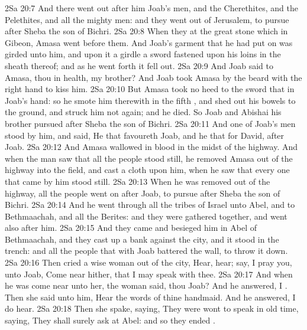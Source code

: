 \vs 2Sa 20:7 And there went out after him Joab's men, and the Cherethites, and the Pelethites, and all the mighty men: and they went out of Jerusalem, to pursue after Sheba the son of Bichri.
\vs 2Sa 20:8 When they  at the great stone which  in Gibeon, Amasa went before them. And Joab's garment that he had put on was girded unto him, and upon it a girdle  a sword fastened upon his loins in the sheath thereof; and as he went forth it fell out.
\vs 2Sa 20:9 And Joab said to Amasa,  thou in health, my brother? And Joab took Amasa by the beard with the right hand to kiss him.
\vs 2Sa 20:10 But Amasa took no heed to the sword that  in Joab's hand: so he smote him therewith in the fifth , and shed out his bowels to the ground, and struck him not again; and he died. So Joab and Abishai his brother pursued after Sheba the son of Bichri.
\vs 2Sa 20:11 And one of Joab's men stood by him, and said, He that favoureth Joab, and he that  for David,  after Joab.
\vs 2Sa 20:12 And Amasa wallowed in blood in the midst of the highway. And when the man saw that all the people stood still, he removed Amasa out of the highway into the field, and cast a cloth upon him, when he saw that every one that came by him stood still.
\vs 2Sa 20:13 When he was removed out of the highway, all the people went on after Joab, to pursue after Sheba the son of Bichri.
\vs 2Sa 20:14 And he went through all the tribes of Israel unto Abel, and to Bethmaachah, and all the Berites: and they were gathered together, and went also after him.
\vs 2Sa 20:15 And they came and besieged him in Abel of Bethmaachah, and they cast up a bank against the city, and it stood in the trench: and all the people that  with Joab battered the wall, to throw it down.
\vs 2Sa 20:16 Then cried a wise woman out of the city, Hear, hear; say, I pray you, unto Joab, Come near hither, that I may speak with thee.
\vs 2Sa 20:17 And when he was come near unto her, the woman said,  thou Joab? And he answered, I . Then she said unto him, Hear the words of thine handmaid. And he answered, I do hear.
\vs 2Sa 20:18 Then she spake, saying, They were wont to speak in old time, saying, They shall surely ask  at Abel: and so they ended .
